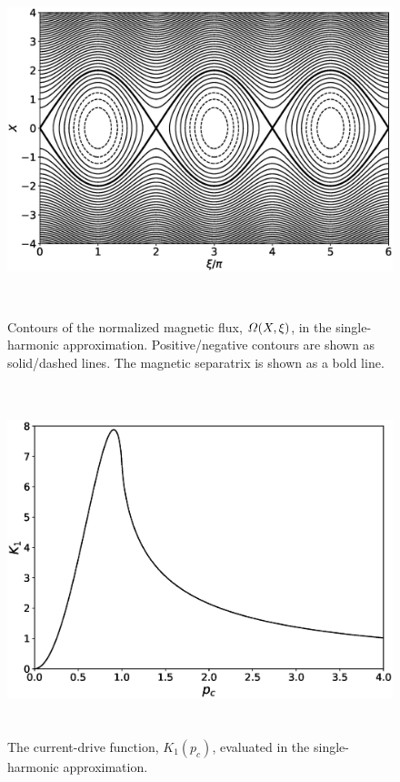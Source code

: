 \documentclass[12pt,prb,aps]{revtex4-1}
\begin{document}
\newpage
\begin{figure}
\centerline{\includegraphics[height=4in]{Figure1.eps}}
\caption{Contours of the normalized magnetic flux, ${\mit\Omega}(X,\xi)$, in the single-harmonic approximation. Positive/negative contours are shown as solid/dashed lines. The magnetic separatrix is shown
as a  bold line.}\label{fig1}
\end{figure}

\begin{figure}
\centerline{\includegraphics[height=4in]{Figure2.eps}}
\caption{The current-drive function, $K_1(p_c)$, evaluated in the single-harmonic approximation.}\label{fig2}
\end{figure}
\end{document}
